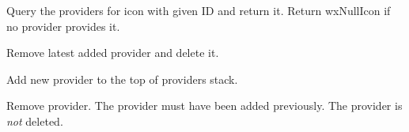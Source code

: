 Query the providers for icon with given ID and return it. Return
wxNullIcon if no provider provides it.

\label{wxartproviderpopprovider}


Remove latest added provider and delete it.

\label{wxartproviderpushprovider}


Add new provider to the top of providers stack.

\label{wxartproviderremoveprovider}


Remove provider. The provider must have been added previously.
The provider is {\it not} deleted.

